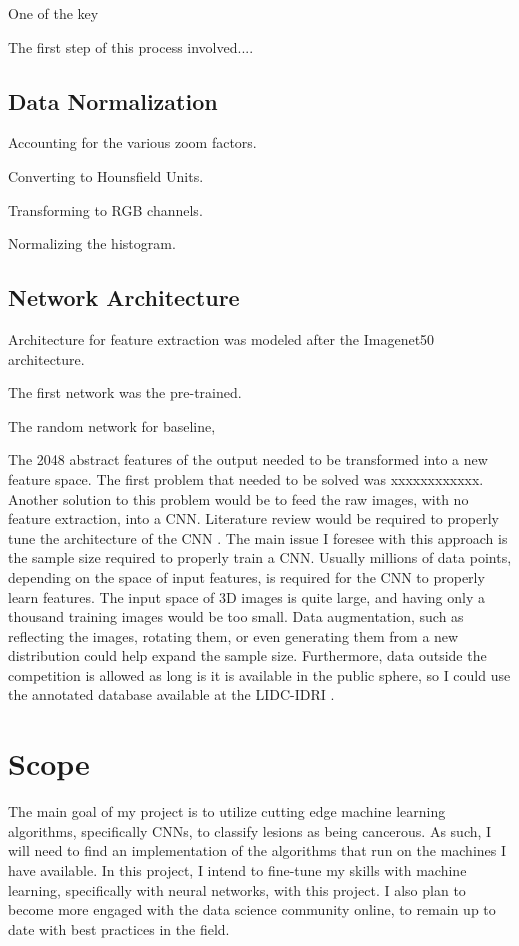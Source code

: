 \documentclass[conference,11pt]{IEEEtran}
\begin{document}
One of the key 

The first step of this process involved....

\subsection{Data Normalization}

Accounting for the various zoom factors.

Converting to Hounsfield Units.

Transforming to RGB channels.

Normalizing the histogram.

\subsection{Network Architecture}

Architecture for feature extraction was modeled after the Imagenet50 architecture.

The first network was the pre-trained.

The random network for baseline,


The 2048 abstract features of the output needed to be transformed into a new feature space. The first problem that needed to be solved was xxxxxxxxxxxx.
Another solution to this problem would be to feed the raw images, with no feature extraction, into a CNN. Literature review would be required to properly tune the architecture of the CNN \cite{litjens_survey_2017}. The main issue I foresee with this approach is the sample size required to properly train a CNN. Usually millions of data points, depending on the space of input features, is required for the CNN to properly learn features. The input space of 3D images is quite large, and having only a thousand training images would be too small. Data augmentation, such as reflecting the images, rotating them, or even generating them from a new distribution could help expand the sample size. Furthermore, data outside the competition is allowed as long is it is available in the public sphere, so I could use the annotated database available at the LIDC-IDRI \cite{armato_lung_2011}.

\section{Scope}

The main goal of my project is to utilize cutting edge machine learning algorithms, specifically CNNs, to classify lesions as being cancerous. As such, I will need to find an implementation of the algorithms that run on the machines I have available. In this project, I intend to fine-tune my skills with machine learning, specifically with neural networks, with this project. I also plan to become more engaged with the data science community online, to remain up to date with best practices in the field.
\end{document}
